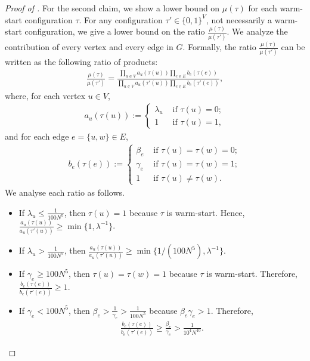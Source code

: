 \documentclass[11pt]{amsart}
\newcommand{\defeq}{:=}
\theoremstyle{definition}
\theoremstyle{remark}
\begin{document}
\begin{proof}[Proof of ]
For the second claim, we show a lower bound on $\mu(\tau)$ for each warm-start configuration $\tau$. For any configuration $\tau' \in \{0,1\}^{V}$, not necessarily a warm-start configuration, we give a lower bound on the ratio $\frac{\mu(\tau)}{\mu(\tau')}$. We analyze the contribution of every vertex and every edge in $G$. Formally, the ratio $\frac{\mu(\tau)}{\mu(\tau')}$ can be written as the following ratio of products:
\begin{align*}
  \frac{\mu(\tau)}{\mu(\tau')} = \frac{ \prod_{u \in V} a_u(\tau(u)) \prod_{e \in E} b_e(\tau(e)) }{ \prod_{u \in V} a_u(\tau'(u)) \prod_{e \in E} b_e(\tau'(e)) },
\end{align*}
where, for each vertex $u \in V$,
\begin{align*}
  a_u(\tau(u))\defeq
  \begin{cases}
    \lambda_u & \text{ if }\tau(u) = 0;\\
    1 & \text{ if }\tau(u) = 1,
  \end{cases}
\end{align*}
and for each edge $e = \{u,w\} \in E$,
\begin{align*}
  b_e(\tau(e))\defeq
  \begin{cases}
    \beta_e & \text{ if }\tau(u) = \tau(w) = 0;\\
    \gamma_e & \text{ if }\tau(u) = \tau(w) = 1;\\    
    1 & \text{ if }\tau(u) \neq \tau(w).
  \end{cases}
\end{align*}
We analyse each ratio as follows.
\begin{itemize}
    \item If $\lambda_u \leq \frac{1}{100N^5}$, then $\tau(u) = 1$ because $\tau$ is warm-start. Hence, $\frac{a_u(\tau(u))}{a_u(\tau'(u))} \geq \min\{1,\lambda^{-1}\}$.
    \item If $\lambda_u > \frac{1}{100N^5}$, then $\frac{a_u(\tau(u))}{a_u(\tau'(u))} \geq \min\{1/(100N^5),\lambda^{-1}\}$.
    \item If $\gamma_e \geq 100N^5$, then $\tau(u) = \tau(w) = 1$ because $\tau$ is warm-start. Therefore, $\frac{b_e(\tau(e))}{b_e(\tau'(e))} \geq 1$.
    \item If $\gamma_e < 100N^5$, then $\beta_e > \frac{1}{\gamma_e} > \frac{1}{100N^5}$ because $\beta_e \gamma_e > 1$. Therefore,
    \begin{align*}
        \frac{b_e(\tau(e))}{b_e(\tau'(e))} \geq \frac{\beta_e}{\gamma_e} > \frac{1}{10^4 N^{10}}.
    \end{align*}

\end{itemize}
\end{proof}
\end{document}
